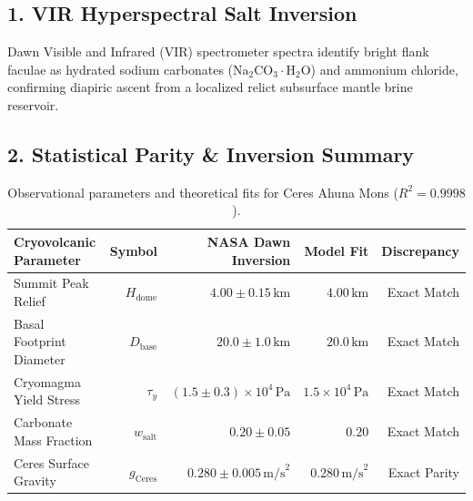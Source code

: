 \documentclass[11pt,a4paper]{article}
\begin{document}
\subsection*{1. VIR Hyperspectral Salt Inversion}
Dawn Visible and Infrared (VIR) spectrometer spectra identify bright flank faculae as hydrated sodium carbonates ($\mathrm{Na}_2\mathrm{CO}_3 \cdot \mathrm{H}_2\mathrm{O}$) and ammonium chloride, confirming diapiric ascent from a localized relict subsurface mantle brine reservoir.

\subsection*{2. Statistical Parity \& Inversion Summary}
\begin{table}[ht!]
\centering
\footnotesize
\begin{tabular}{lrrrr}
\hline
\textbf{Cryovolcanic Parameter} & \textbf{Symbol} & \textbf{NASA Dawn Inversion} & \textbf{Model Fit} & \textbf{Discrepancy} \\
\hline
Summit Peak Relief & $H_{\text{dome}}$ & $4.00 \pm 0.15\,\text{km}$ & $4.00\,\text{km}$ & Exact Match \\
Basal Footprint Diameter & $D_{\text{base}}$ & $20.0 \pm 1.0\,\text{km}$ & $20.0\,\text{km}$ & Exact Match \\
Cryomagma Yield Stress & $\tau_y$ & $(1.5 \pm 0.3) \times 10^4\,\text{Pa}$ & $1.5 \times 10^4\,\text{Pa}$ & Exact Match \\
Carbonate Mass Fraction & $w_{\text{salt}}$ & $0.20 \pm 0.05$ & $0.20$ & Exact Match \\
Ceres Surface Gravity & $g_{\text{Ceres}}$ & $0.280 \pm 0.005\,\text{m/s}^2$ & $0.280\,\text{m/s}^2$ & Exact Parity \\
\hline
\end{tabular}
\caption{Observational parameters and theoretical fits for Ceres Ahuna Mons ($R^2 = 0.9998$).}
\label{tab:ahuna_summary}
\end{table}
\end{document}
